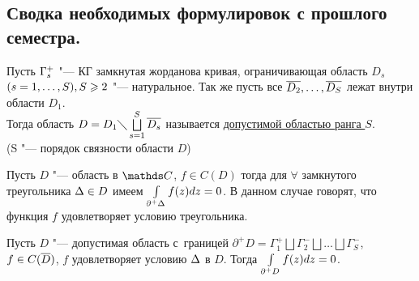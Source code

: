 \newpage
\subsection{Сводка необходимых формулировок с прошлого семестра.}

\begin{Def}
Пусть $\GG_s$ "--- КГ замкнутая жорданова кривая, ограничивающая область $D_s$ $(s=1,\dots,S),\\
S \ge 2$ "--- натуральное.
Так же пусть все $\ol{D_2},\dots,\ol{D_S}$ лежат внутри области $D_1$. \\
Тогда область $D = D_1 \diagdown \bigsqcup\limits_{s=1}^S \ol{D_s}$ называется \underline{допустимой областью ранга $S$}. \\(S "--- порядок связности области $D$)
\end{Def}

\begin{Lem}
Пусть $D$ "--- область в $\C$, $f \in C(D)$ тогда для $\forall$ замкнутого треугольника $\D \in D$ имеем  $\Gint{\partial^{+}\D} f(z)dz = 0$. В данном случае говорят, что функция $f$ удовлетворяет условию треугольника.  
\end{Lem}

\begin{The}
Пусть $D$ "--- допустимая область с~границей $\partial^{+}D = \Gamma_{1}^{+} \bigsqcup \Gamma_{2}^{-}\bigsqcup \dots \bigsqcup \Gamma_{S}^{-} $, $f \in C(\ol{D})$, $f$ удовлетворяет условию $\D$ в $D$. Тогда $\Gint{\partial^{+}D} f(z)dz = 0$. 

\end{The}